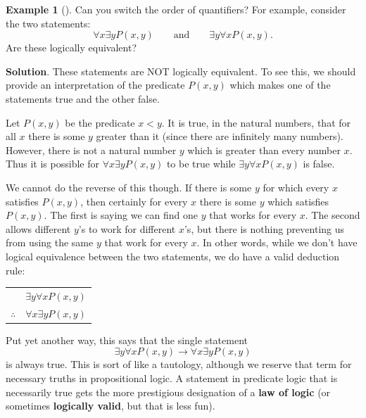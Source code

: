 \documentclass[10pt,]{book}
\newcommand{\terminology}[1]{\textbf{#1}}
\theoremstyle{plain}
\theoremstyle{definition}
\theoremstyle{definition}
\newtheorem{example}[theorem]{Example}
\theoremstyle{definition}
\theoremstyle{definition}
\numberwithin{equation}{chapter}
\newcommand{\hrulethin}  {\noalign{\hrule height 0.04em}}
\def\imp{\rightarrow}
\newcommand{\lt}{<}
\begin{document}
\begin{example}[]\label{example-63}
\hypertarget{p-1850}{}%
Can you switch the order of quantifiers? For example, consider the two statements:%
\begin{equation*}
\forall x \exists y P(x,y) \qquad \mathrm{ and } \qquad \exists y \forall x P(x,y).
\end{equation*}
Are these logically equivalent?%
\par\smallskip%
\noindent\textbf{Solution}.\hypertarget{solution-172}{}\quad%
\hypertarget{p-1851}{}%
These statements are NOT logically equivalent. To see this, we should provide an interpretation of the predicate \(P(x,y)\) which makes one of the statements true and the other false.%
\par
\hypertarget{p-1852}{}%
Let \(P(x,y)\) be the predicate \(x \lt  y\). It is true, in the natural numbers, that for all \(x\) there is some \(y\) greater than it (since there are infinitely many numbers). However, there is not a natural number \(y\) which is greater than every number \(x\).  Thus it is possible for \(\forall x \exists y P(x,y)\) to be true while \(\exists y \forall x P(x,y)\) is false.%
\par
\hypertarget{p-1853}{}%
We cannot do the reverse of this though. If there is some \(y\) for which every \(x\) satisfies \(P(x,y)\), then certainly for every \(x\) there is some \(y\) which satisfies \(P(x,y)\). The first is saying we can find one \(y\) that works for every \(x\). The second allows different \(y\)'s to work for different \(x\)'s, but there is nothing preventing us from using the same \(y\) that work for every \(x\).  In other words, while we don't have logical equivalence between the two statements, we do have a valid deduction rule:%
\begin{sidebyside}{1}{0}{0}{0}
\begin{sbspanel}{1}
{\centering%
\begin{tabular}{cc}
&\(\exists y \forall x P(x,y)\)\tabularnewline\hrulethin
\(\therefore\)&\(\forall x \exists y P(x,y)\)
\end{tabular}
\par}
\end{sbspanel}
\end{sidebyside}
\par
\hypertarget{p-1854}{}%
Put yet another way, this says that the single statement%
\begin{equation*}
\exists y \forall x P(x,y) \imp \forall x \exists y P(x,y)
\end{equation*}
is always true.  This is sort of like a tautology, although we reserve that term for necessary truths in propositional logic.  A statement in predicate logic that is necessarily true gets the more prestigious designation of a \terminology{law of logic} (or sometimes \terminology{logically valid}, but that is less fun).%
\end{example}
\typeout{************************************************}
\typeout{************************************************}
\end{document}
